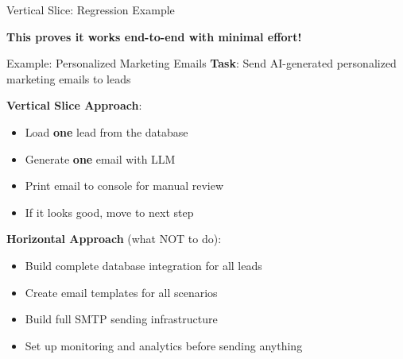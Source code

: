 \documentclass[aspectratio=169]{beamer}
\begin{document}
\begin{frame}{Vertical Slice: Regression Example}
\begin{center}
\end{center}
\vspace{0.2cm}
\textbf{This proves it works end-to-end with minimal effort!}
\end{frame}

\begin{frame}{Example: Personalized Marketing Emails}
\textbf{Task}: Send AI-generated personalized marketing emails to leads
\vspace{0.3cm}

\textbf{Vertical Slice Approach}:
\begin{itemize}
    \item Load \textbf{one} lead from the database
    \item Generate \textbf{one} email with LLM
    \item Print email to console for manual review
    \item If it looks good, move to next step
\end{itemize}
\vspace{0.3cm}

\textbf{Horizontal Approach} (what NOT to do):
\begin{itemize}
    \item Build complete database integration for all leads
    \item Create email templates for all scenarios
    \item Build full SMTP sending infrastructure
    \item Set up monitoring and analytics before sending anything
\end{itemize}
\end{frame}
\end{document}
